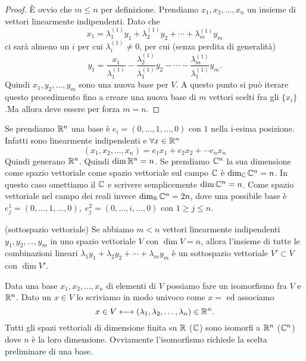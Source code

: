 \begin{proof}
È ovvio che $m \leq n$ per definizione. Prendiamo $x_1, x_2, \ldots, x_n$ un insieme di vettori linearmente indipendenti. Dato che 
\begin{equation*}
x_1 = \lambda_1^{(1)} y_1 + \lambda_2^{(1)} y_2 + \cdots + \lambda_m^{(1)} y_m
\end{equation*}
ci sarà almeno un $i$ per cui $\lambda_i^{(1)} \neq 0$, per cui (senza perdita di generalità)
\begin{equation*}
y_1 = \frac{x_1}{\lambda_1^{(1)}} - \frac{\lambda_2^{(1)}}{\lambda_1^{(1)}} y_2 - \cdots - \frac{\lambda_m^{(1)}}{\lambda_1^{(1)}} y_m.
\end{equation*} 
Quindi $x_1, y_2, \ldots , y_m$ sono una nuova base per $V$. A questo punto si può iterare questo procedimento fino a creare una nuova base di $m$ vettori scelti fra gli $\{x_i\}$.Ma allora deve essere per forza $m=n$. 
\end{proof}

Se prendiamo $\mathbb R^n$ una base è $e_i = (0, \ldots, 1, \ldots,0)$ con $1$ nella i-esima posizione. Infatti sono linearmente indipendenti e $\forall x \in \mathbb R^n$ 
\begin{equation*}
(x_1, x_2, \ldots, x_n) = e_1 x_1 + e_2 x_2 + \cdots e_n x_n
\end{equation*}
Quindi generano $\mathbb R^n$. Quindi $\dim{\mathbb R^n} = n$. Se prendiamo $\mathbb C^n$ la sua dimensione come spazio vettoriale come spazio vettoriale sul campo $\mathbb C$ è $\dim_\mathbb C{\mathbb C^n} = n$. In questo caso omettiamo il $ \mathbb C$ e scrivere semplicemente $\dim{\mathbb C^n} =  n$. Come spazio vettoriale nel campo dei reali invece $\dim_\mathbb R{\mathbb C^n} = 2n$, dove una possibile base è $e_j^1 = (0,\ldots,1,\ldots,0), \; e_j^2 = (0,\ldots,i,\ldots,0)$ con $1 \geq j \leq n$. 

\begin{definition}{(sottospazio vettoriale)}
Se abbiamo $m<n$ vettori linearmente indipendenti $y_1, y_2, \ldots , y_m$ in uno spazio vettoriale $V$ con $\dim	{V} = n$, allora l'insieme di tutte le combinazioni lineari $\lambda_1 y_1 + \lambda_2 y_2 + \cdots + \lambda_m y_m$ è un sottospazio vettoriale $V' \subset V$ con $\dim{V'}$.
\end{definition}

Data una base $x_1, x_2, \ldots, x_n$ di elementi di $V$ possiamo fare un isomorfismo fra $V$ e $\mathbb R^n$. Dato un $x \in V$ lo scriviamo in modo univoco come $x = $ ed associamo 
\begin{equation*}
x \in V \longleftrightarrow (\lambda_1, \lambda_2, \ldots, \lambda_n) \in \mathbb R^n.
\end{equation*}
Tutti gli spazi vettoriali di dimensione finita su $\mathbb R$ ($\mathbb C$) sono isomorfi a $\mathbb R^n$ ($\mathbb C^n$) dove $n$ è la loro dimensione. Ovviamente l'isomorfismo richiede la scelta preliminare di una base.

